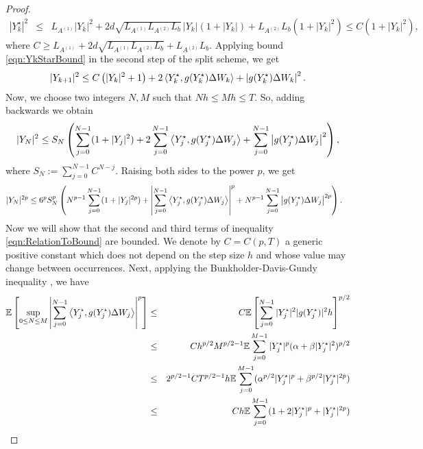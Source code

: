 \begin{proof}
\begin{eqnarray*}
	|Y_k^{\star}|^2
	&\leq&	L_{A^{(1)}} |Y_k|^2
	+ 2 d \sqrt{L_{A^{(1)}} L_{A^{(2)}} L_b }\,|Y_k|(1+|Y_k|)
	+L_{A^{(2)}} L_b (1+|Y_k|^2)		
	\leq C(1+|Y_k|^2),
\end{eqnarray*}
where $C\geq L_{A^{(1)}}+ 2 d \sqrt{L_{A^{(1)}} L_{A^{(2)}} L_b} + 
L_{A^{(2)}} L_b$. Applying  bound \eqref{eqn:YkStarBound} 
in the  second step of the split scheme, we get
\begin{equation*}
	|Y_{k+1}|^2
	\leq
	C \left(
	|Y_k|^2 + 1
	\right)
	+ 2\left\langle Y^{\star}_k, g(Y^{\star}_k) \Delta W_k\right\rangle
	+ \left|g(Y^{\star}_k) \Delta W_k \right|^2.
\end{equation*}
Now, we choose two integers $N,M$ such that $Nh\leq Mh \leq T$. So, adding 
backwards we obtain
\begin{equation*}
	|Y_N|^2
	\leq
	S_N\left(
	\sum_{j=0}^{N-1}
	(1+|Y_j|^2)
	+
	2\sum_{j=0}^{N-1}
	\left\langle Y_j^{\star}, g(Y_j^{\star}) \Delta W_j\right\rangle
	+
	\sum_{j=0}^{N-1}
	\left|
	g(Y_j^{\star}) \Delta W_j
	\right|^2
	\right),
\end{equation*}
where	$S_N:=	\sum_{j=0}^{N-1}C^{N-j}$. Raising both sides to the 
power $p$,  we get
\begin{align}\label{eqn:RelationToBound}
	|Y_N|^{2p}	
	&\leq
	6^{p} S_N^p
	\left(
	N^{p-1}
	\sum_{j=0}^{N-1}
	(1+|Y_j|^{2p})	
	+
	\left|
	\sum_{j=0}^{N-1}
	\left\langle Y_j^{\star}, g(Y_j^{\star}) \Delta W_j\right\rangle
	\right|^p
	+
	N^{p-1}
	\sum_{j=0}^{N-1}
	\left|
	g(Y_j^{\star}) \Delta W_j
	\right|^{2 p}				
	\right).
\end{align}
Now we will show that the second and third terms of inequality \eqref{eqn:RelationToBound} are bounded.
We denote by $C=C(p,T)$ a generic positive constant which does not depend on  the step size $h$ and whose
value may change between occurrences.	Next, applying the Bunkholder-Davis-Gundy
inequality  \cite{Mao2007}, we have
\begin{eqnarray}\label{eqn:BoundSecondTerm}
\m
\left[
\sup_{0\leq N \leq M}
\left|
\sum_{j=0}^{N-1}
\innerprod{Y_j^{\star}}{g(Y_j^{\star})\Delta W_j}
\right|^{p}
\right]
&\leq&
C\m
\left[
\sum_{j=0}^{N-1}
|Y_j^{\star}|^2
|g(Y_j^{\star})|^2
h
\right]^{p/2}
\notag\\
&\leq&
C h^{p/2}M^{p/2-1}
\m
\sum_{j=0}^{M-1}
|Y_j^{\star}|^p (\alpha +\beta |Y_j^{\star}|^2)^{p/2}
\notag\\
&\leq&
2^{p/2-1}C T^{p/2-1} h  
\m
\sum_{j=0}^{M-1}
(\alpha^{p/2}|Y_j^{\star}|^p +\beta^{p/2} |Y_j^{\star}|^{2p})
\notag\\
&\leq&
C h
\m
\sum_{j=0}^{M-1}
(1+2|Y_j^{\star}|^p + |Y_j^{\star}|^{2p})

\end{eqnarray}
\end{proof}
